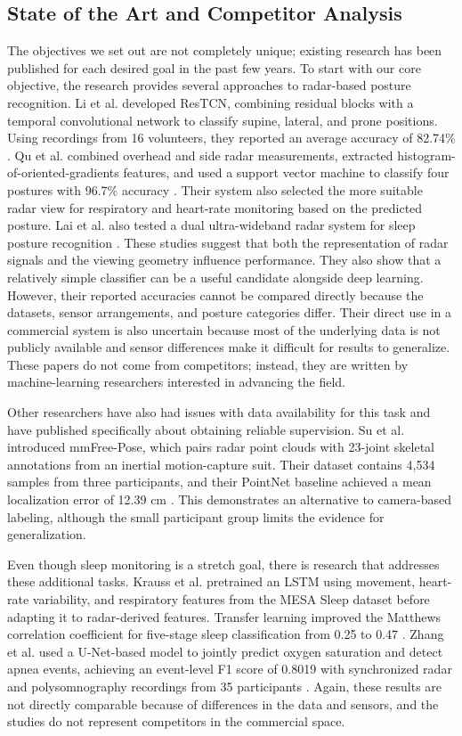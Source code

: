 \subsection{State of the Art and Competitor Analysis}
The objectives we set out are not completely unique; existing research has been published for each desired goal in the past few years. To start with our core objective, the research provides several approaches to radar-based posture recognition. Li et al. developed ResTCN, combining residual blocks with a temporal convolutional network to classify supine, lateral, and prone positions. Using recordings from 16 volunteers, they reported an average accuracy of 82.74\% \cite{li2024sleepingpose}. Qu et al. combined overhead and side radar measurements, extracted histogram-of-oriented-gradients features, and used a support vector machine to classify four postures with 96.7\% accuracy \cite{qu2026sleep}. Their system also selected the more suitable radar view for respiratory and heart-rate monitoring based on the predicted posture. Lai et al. also tested a dual ultra-wideband radar system for sleep posture recognition \cite{lai2023dual}. These studies suggest that both the representation of radar signals and the viewing geometry influence performance. They also show that a relatively simple classifier can be a useful candidate alongside deep learning. However, their reported accuracies cannot be compared directly because the datasets, sensor arrangements, and posture categories differ. Their direct use in a commercial system is also uncertain because most of the underlying data is not publicly available and sensor differences make it difficult for results to generalize. These papers do not come from competitors; instead, they are written by machine-learning researchers interested in advancing the field.

Other researchers have also had issues with data availability for this task and have published specifically about obtaining reliable supervision. Su et al. introduced mmFree-Pose, which pairs radar point clouds with 23-joint skeletal annotations from an inertial motion-capture suit. Their dataset contains 4,534 samples from three participants, and their PointNet baseline achieved a mean localization error of 12.39 cm \cite{su2025mmfreepose}. This demonstrates an alternative to camera-based labeling, although the small participant group limits the evidence for generalization.

Even though sleep monitoring is a stretch goal, there is research that addresses these additional tasks. Krauss et al. pretrained an LSTM using movement, heart-rate variability, and respiratory features from the MESA Sleep dataset before adapting it to radar-derived features. Transfer learning improved the Matthews correlation coefficient for five-stage sleep classification from 0.25 to 0.47 \cite{krauss2025transfer}. Zhang et al. used a U-Net-based model to jointly predict oxygen saturation and detect apnea events, achieving an event-level F1 score of 0.8019 with synchronized radar and polysomnography recordings from 35 participants \cite{zhang2025apnea}. Again, these results are not directly comparable because of differences in the data and sensors, and the studies do not represent competitors in the commercial space.

